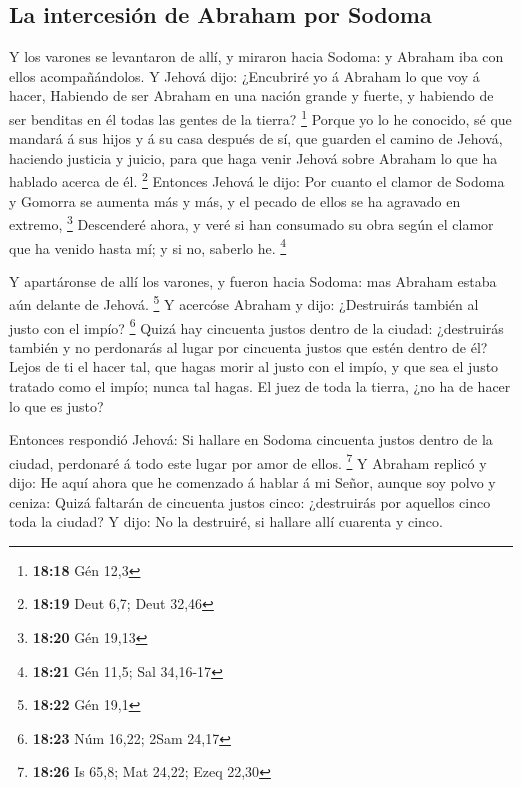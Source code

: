 \hypertarget{la-intercesiuxf3n-de-abraham-por-sodoma}{%
\subsection{La intercesión de Abraham por
Sodoma}\label{la-intercesiuxf3n-de-abraham-por-sodoma}}

 Y los varones se levantaron de allí, y miraron hacia
Sodoma: y Abraham iba con ellos acompañándolos.  Y Jehová
dijo: ¿Encubriré yo á Abraham lo que voy á hacer, 
Habiendo de ser Abraham en una nación grande y fuerte, y habiendo de ser
benditas en él todas las gentes de la tierra? \footnote{\textbf{18:18}
  Gén 12,3}  Porque yo lo he conocido, sé que mandará á
sus hijos y á su casa después de sí, que guarden el camino de Jehová,
haciendo justicia y juicio, para que haga venir Jehová sobre Abraham lo
que ha hablado acerca de él. \footnote{\textbf{18:19} Deut 6,7; Deut
  32,46}  Entonces Jehová le dijo: Por cuanto el clamor
de Sodoma y Gomorra se aumenta más y más, y el pecado de ellos se ha
agravado en extremo, \footnote{\textbf{18:20} Gén 19,13} 
Descenderé ahora, y veré si han consumado su obra según el clamor que ha
venido hasta mí; y si no, saberlo he. \footnote{\textbf{18:21} Gén 11,5;
  Sal 34,16-17}

 Y apartáronse de allí los varones, y fueron hacia
Sodoma: mas Abraham estaba aún delante de Jehová. \footnote{\textbf{18:22}
  Gén 19,1}  Y acercóse Abraham y dijo: ¿Destruirás
también al justo con el impío? \footnote{\textbf{18:23} Núm 16,22; 2Sam
  24,17}  Quizá hay cincuenta justos dentro de la ciudad:
¿destruirás también y no perdonarás al lugar por cincuenta justos que
estén dentro de él?  Lejos de ti el hacer tal, que hagas
morir al justo con el impío, y que sea el justo tratado como el impío;
nunca tal hagas. El juez de toda la tierra, ¿no ha de hacer lo que es
justo?

 Entonces respondió Jehová: Si hallare en Sodoma
cincuenta justos dentro de la ciudad, perdonaré á todo este lugar por
amor de ellos. \footnote{\textbf{18:26} Is 65,8; Mat 24,22; Ezeq 22,30}
 Y Abraham replicó y dijo: He aquí ahora que he comenzado
á hablar á mi Señor, aunque soy polvo y ceniza:  Quizá
faltarán de cincuenta justos cinco: ¿destruirás por aquellos cinco toda
la ciudad? Y dijo: No la destruiré, si hallare allí cuarenta y cinco.


